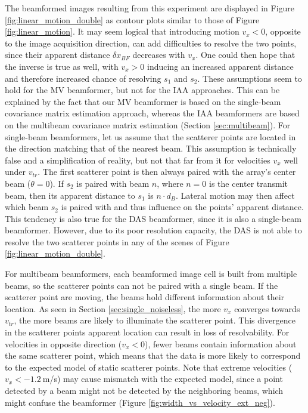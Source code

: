 The beamformed images resulting from this experiment are displayed in Figure \ref{fig:linear_motion_double} as contour plots similar to those of Figure \ref{fig:linear_motion}.
It may seem logical that introducing motion $v_x < 0$, opposite to the image acquisition direction, can add difficulties to resolve the two points, since their apparent distance $\delta x_{BF}$ decreases with $v_x$. One could then hope that the inverse is true as well, with $v_x > 0$ inducing an increased apparent distance and therefore increased chance of resolving $s_1$ and $s_2$. 
These assumptions seem to hold for the MV beamformer, but not for the IAA approaches. This can be explained by the fact that our MV beamformer is based on the single-beam covariance matrix estimation approach, whereas the IAA beamformers are based on the multibeam covariance matrix estimation (Section \ref{sec:multibeam}).
For single-beam beamformers, let us assume that the scatterer points are located in the direction matching that of the nearest beam. This assumption is technically false and a simplification of reality, but not that far from it for velocities $v_x$ well under $v_{tr}$. The first scatterer point is then always paired with the array's center beam ($\theta = 0$). If $s_2$ is paired with beam $n$, where $n=0$ is the center transmit beam, then its apparent distance to $s_1$ is $n \cdot d_B$. Lateral motion may then affect which beam $s_2$ is paired with and thus influence on the points' apparent distance.
This tendency is also true for the DAS beamformer, since it is also a single-beam beamformer. However, due to its poor resolution capacity, the DAS is not able to resolve the two scatterer points in any of the scenes of Figure \ref{fig:linear_motion_double}.

For multibeam beamformers, each beamformed image cell is built from multiple beams, so the scatterer points can not be paired with a single beam. 
If the scatterer point are moving, the beams hold different information about their location. As seen in Section \ref{sec:single_noiseless}, the more $v_x$ converges towards $v_{tr}$, the more beams are likely to illuminate the scatterer point. This divergence in the scatterer points apparent location can result in loss of resolvability.
For velocities in opposite direction ($v_x < 0$), fewer beams contain information about the same scatterer point, which means that the data is more likely to correspond to the expected model of static scatterer points.
Note that extreme velocities ($v_x < -1.2~$m/s) may cause mismatch with the expected model, since a point detected by a beam might not be detected by the neighboring beams, which might confuse the beamformer (Figure \ref{fig:width_vs_velocity_ext_neg}).

